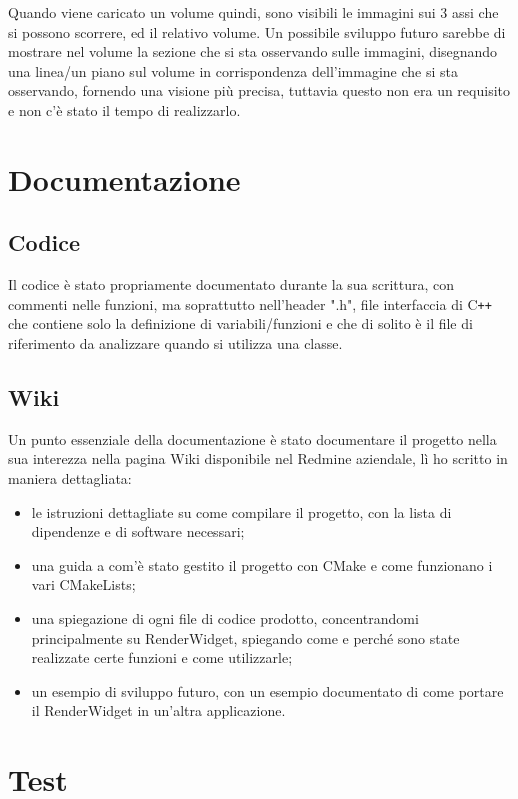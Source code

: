 Quando viene caricato un volume quindi, sono visibili le immagini sui 3 assi che si possono scorrere, ed il relativo volume. Un possibile sviluppo futuro sarebbe di mostrare nel volume la sezione che si sta osservando sulle immagini, disegnando una linea/un piano sul volume in corrispondenza dell'immagine che si sta osservando, fornendo una visione più precisa, tuttavia questo non era un requisito e non c'è stato il tempo di realizzarlo.

\section{Documentazione}
\subsection{Codice}
Il codice è stato propriamente documentato durante la sua scrittura, con commenti nelle funzioni, ma soprattutto nell'header ".h", file interfaccia di C\texttt{++} che contiene solo la definizione di variabili/funzioni e che di solito è il file di riferimento da analizzare quando si utilizza una classe.

\subsection{Wiki}
Un punto essenziale della documentazione è stato documentare il progetto nella sua interezza nella pagina Wiki disponibile nel Redmine aziendale, lì ho scritto in maniera dettagliata:
\begin{itemize}
\item le istruzioni dettagliate su come compilare il progetto, con la lista di dipendenze e di software necessari;
\item una guida a com'è stato gestito il progetto con CMake e come funzionano i vari CMakeLists;
\item una spiegazione di ogni file di codice prodotto, concentrandomi principalmente su RenderWidget, spiegando come e perché sono state realizzate certe funzioni e come utilizzarle;
\item un esempio di sviluppo futuro, con un esempio documentato di come portare il RenderWidget in un'altra applicazione.
\end{itemize}

\section{Test}\label{sec:test-begin}
